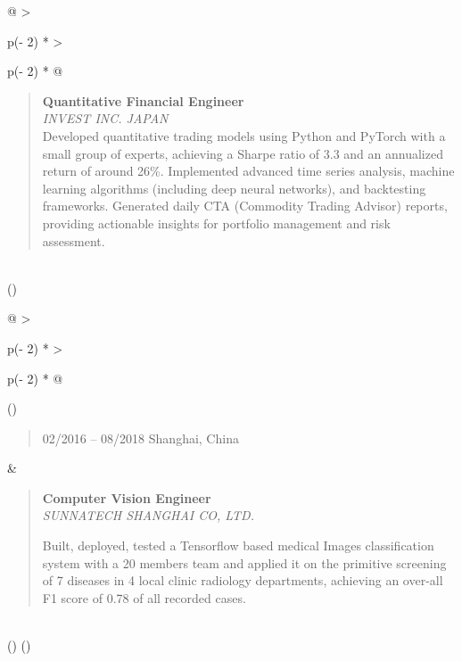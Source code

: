 \documentclass[
]{article}
\begin{document}
\begin{longtable}[]{@{}
  >{\raggedright\arraybackslash}p{(\columnwidth - 2\tabcolsep) * }
  >{\raggedright\arraybackslash}p{(\columnwidth - 2\tabcolsep) * }@{}}
\begin{minipage}[t]{\linewidth}
\begin{quote}
\textbf{Quantitative Financial Engineer}\\
\emph{INVEST INC. JAPAN}\\
Developed quantitative trading models using Python and PyTorch with a
small group of experts, achieving a Sharpe ratio of 3.3 and an
annualized return of around 26\%. Implemented advanced time series
analysis, machine learning algorithms (including deep neural networks),
and backtesting frameworks. Generated daily CTA (Commodity Trading
Advisor) reports, providing actionable insights for portfolio management
and risk assessment.
\end{quote}\strut
\end{minipage} \\
\bottomrule()
\end{longtable}

\begin{longtable}[]{@{}
  >{\raggedright\arraybackslash}p{(\columnwidth - 2\tabcolsep) * }
  >{\raggedright\arraybackslash}p{(\columnwidth - 2\tabcolsep) * }@{}}
\toprule()
\begin{minipage}[b]{\linewidth}\raggedright
\begin{quote}
02/2016 -- 08/2018 Shanghai, China
\end{quote}
\end{minipage} & \begin{minipage}[b]{\linewidth}\raggedright
\begin{quote}
\textbf{Computer Vision Engineer}\\
\emph{SUNNATECH SHANGHAI CO, LTD.}

Built, deployed, tested a Tensorflow based medical Images classification
system with a 20 members team and applied it on the primitive screening
of 7 diseases in 4 local clinic radiology departments, achieving an
over-all F1 score of 0.78 of all recorded cases.
\end{quote}\strut
\end{minipage} \\
\midrule()
\endhead
\bottomrule()
\end{longtable}
\end{document}
